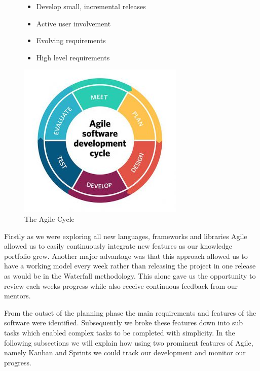 \begin{figure}[H]
\begin{minipage}{.5\textwidth}  %
\lstset{linewidth = 4cm, breaklines=true} %
\begin{itemize}
\item Develop small, incremental releases
\item Active user involvement
\item Evolving requirements
\item High level requirements
\end{itemize}

\end{minipage}
\qquad %
\begin{minipage}{0.4\textwidth} %
\includegraphics[scale=.4]{img/agile.jpg} %
\caption{The Agile Cycle}
\end{minipage}
\end{figure}

Firstly as we were exploring all new languages, frameworks and libraries Agile allowed us to easily continuously integrate new features as our knowledge portfolio grew. Another major advantage was that this approach allowed us to have a working model every week rather than releasing the project in one release as would be in the Waterfall methodology. This alone gave us the opportunity to review each weeks progress while also receive continuous feedback from our mentors.

From the outset of the planning phase the main requirements and features of the software were identified. Subsequently we broke these features down into sub tasks which enabled complex tasks to be completed with simplicity. In the following subsections we will explain how using two prominent features of Agile, namely Kanban and Sprints we could track our development and monitor our progress.


